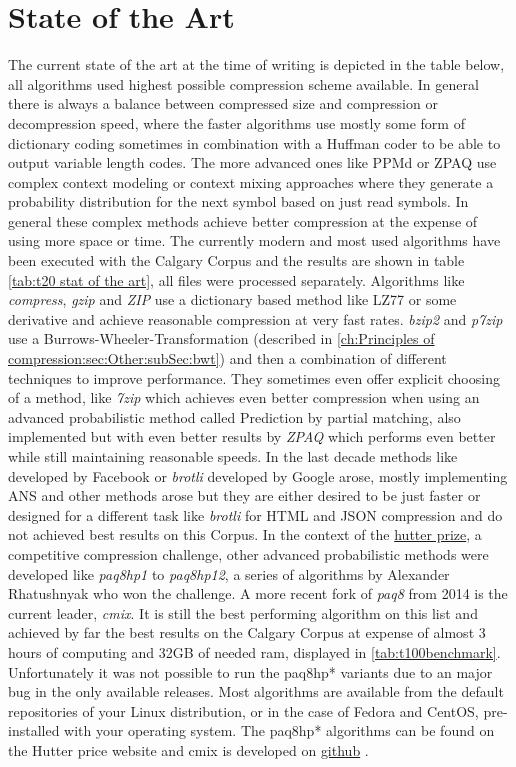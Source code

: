 \section{State of the Art}
\label{ch:Principles of compression:sec:SOTA}
\par{
The current state of the art at the time of writing is depicted in the table below, all algorithms used highest possible compression scheme available. In general there is always a balance between compressed size and compression or decompression speed, where the faster algorithms use mostly some form of dictionary coding sometimes in combination with a Huffman coder to be able to output variable length codes. The more advanced ones like PPMd or ZPAQ use complex context modeling or context mixing approaches where they generate a probability distribution for the next symbol based on just read symbols. In general these complex methods achieve better compression at the expense of using more space or time. The currently modern and most used algorithms have been executed with the Calgary Corpus and the results are shown in table \ref{tab:t20 stat of the art}, all files were processed separately. Algorithms like \textit{compress}, \textit{gzip} and \textit{ZIP} use a dictionary based method like LZ77 or some derivative and achieve reasonable compression at very fast rates. \textit{bzip2} and \textit{p7zip} use a Burrows-Wheeler-Transformation (described in \ref{ch:Principles of compression:sec:Other:subSec:bwt}) and then a combination of different techniques to improve performance. They sometimes even offer explicit choosing of a method, like \textit{7zip} which achieves even better compression when using an advanced probabilistic method called Prediction by partial matching, also implemented but with even better results by \textit{ZPAQ} which performs even better while still maintaining reasonable speeds. In the last decade methods like  developed by Facebook or \textit{brotli} developed by Google arose, mostly implementing ANS and other methods arose but they are either desired to be just faster or designed for a different task like \textit{brotli} for HTML and JSON compression and do not achieved best results on this Corpus. In the context of the \href{http://prize.hutter1.net/}{hutter prize}, a competitive compression challenge, other advanced probabilistic methods were developed like \textit{paq8hp1} to \textit{paq8hp12}, a series of algorithms by Alexander Rhatushnyak \cite{mahoney2011large} who won the challenge. A more recent fork of \textit{paq8} from 2014 is the current leader, \textit{cmix}. It is still the best performing algorithm on this list and achieved by far the best results on the Calgary Corpus at expense of almost 3 hours of computing and 32GB of needed ram, displayed in \ref{tab:t100benchmark}. Unfortunately it was not possible to run the paq8hp* variants due to an major bug in the only available releases. Most algorithms are available from the default repositories of your Linux distribution, or in the case of Fedora and CentOS, pre-installed with your operating system. The paq8hp* algorithms can be found on the Hutter price website and cmix is developed on \href{https://github.com/byronknoll/cmix}{github} \cite{cmix}.
}
